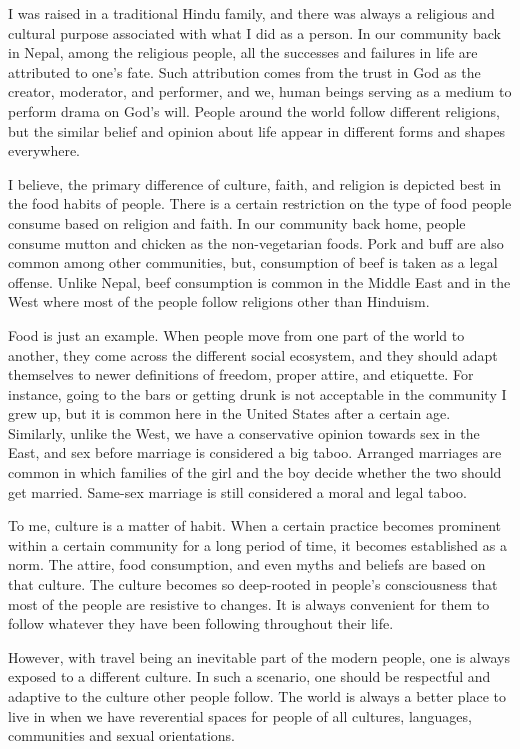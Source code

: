 \documentclass[oneside,12pt]{book}
\begin{document}
I was raised in a traditional Hindu family, and there was always a religious and cultural purpose associated with what I did as a person. In our community back in Nepal, among the religious people, all the successes and failures in life are attributed to one’s fate.  Such attribution comes from the trust in God as the creator, moderator, and performer, and we, human beings serving as a medium to perform drama on God's will. People around the world follow different religions, but the similar belief and opinion about life appear in different forms and shapes everywhere.

I believe, the primary difference of culture, faith, and religion is depicted best in the food habits of people.  There is a certain restriction on the type of food people consume based on religion and faith. In our community back home, people consume mutton and chicken as the non-vegetarian foods. Pork and buff are also common among other communities, but, consumption of beef is taken as a legal offense. Unlike Nepal, beef consumption is common in the Middle East and in the West where most of the people follow religions other than Hinduism. 

Food is just an example. When people move from one part of the world to another, they come across the different social ecosystem, and they should adapt themselves to newer definitions of freedom, proper attire, and etiquette. For instance, going to the bars or getting drunk is not acceptable in the community I grew up, but it is common here in the United States after a certain age. Similarly, unlike the West, we have a conservative opinion towards sex in the East, and sex before marriage is considered a big taboo. Arranged marriages are common in which families of the girl and the boy decide whether the two should get married. Same-sex marriage is still considered a moral and legal taboo. 

To me, culture is a matter of habit. When a certain practice becomes prominent within a certain community for a long period of time, it becomes established as a norm. The attire, food consumption, and even myths and beliefs are based on that culture. The culture becomes so deep-rooted in people’s consciousness that most of the people are resistive to changes. It is always convenient for them to follow whatever they have been following throughout their life. 

However, with travel being an inevitable part of the modern people, one is always exposed to a different culture. In such a scenario, one should be respectful and adaptive to the culture other people follow. The world is always a better place to live in when we have reverential spaces for people of all cultures, languages, communities and sexual orientations. 
\end{document}
